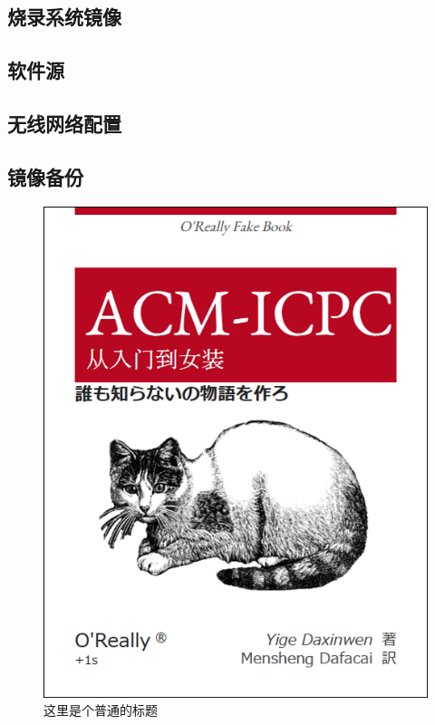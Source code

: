 		\subsection{烧录系统镜像}
		\subsection{软件源}
		\subsection{无线网络配置}
		\subsection{镜像备份}
\begin{figure}[ht]
	\centering
	\includegraphics[scale=0.6]{figures/figure1.png}
	\caption{
		这里是个普通的标题
	}
	\label{fig:example}
\end{figure}
\endinput